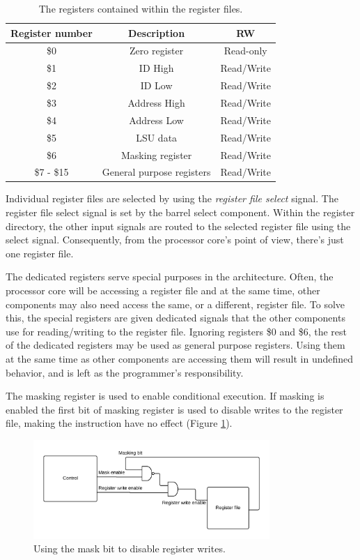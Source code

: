 \documentclass[../main/report.tex]{subfiles}
\begin{document}
\begin{table}[H]
	\centering
	\begin{tabular}{|c|c|c|}
		\hline Register number & Description & RW \\ 
		\hline \$0 & Zero register & Read-only \\ 
		\hline \$1 & ID High & Read/Write \\ 
		\hline \$2 & ID Low & Read/Write \\ 
		\hline \$3 & Address High & Read/Write \\ 
		\hline \$4 & Address Low & Read/Write \\ 
		\hline \$5 & LSU data & Read/Write \\ 
		\hline \$6 & Masking register & Read/Write \\ 
		\hline \$7 - \$15 & General purpose registers & Read/Write \\ 
		\hline 
	\end{tabular} 
	\caption{The registers contained within the register files.}
	\label{tab:registers_overview}
\end{table}

Individual register files are selected by using the \emph{register file select} signal.
The register file select signal is set by the barrel select component.
Within the register directory, the other input signals are routed to the selected register file using the select signal.
Consequently, from the processor core's point of view, there's just one register file.

The dedicated registers serve special purposes in the architecture.
Often, the processor core will be accessing a register file and at the same time, other components may also need access the same, or a different, register file.
To solve this, the special registers are given dedicated signals that the other components use for reading/writing to the register file.
Ignoring registers \$0 and \$6, the rest of the dedicated registers may be used as general purpose registers.
Using them at the same time as other components are accessing them will result in undefined behavior, and is left as the programmer's responsibility.

The masking register is used to enable conditional execution.
If masking is enabled the first bit of masking register is used to disable writes to the register file, making the instruction have no effect (Figure \ref{fig:masking}).
\begin{figure}[H]
	\centering
	\includegraphics[width=0.8\textwidth]{../gpu/diagrams/masking.png}
	\caption{Using the mask bit to disable register writes.}
	\label{fig:masking}
\end{figure}
\end{document}
